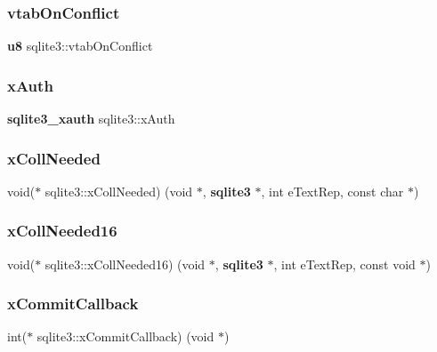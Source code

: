 \mbox{\label{structsqlite3_acb957d1be62bc33b9f28201cd6dc4d5a}} 
\subsubsection{vtabOnConflict}
{\footnotesize\ttfamily \textbf{ u8} sqlite3\+::vtab\+On\+Conflict}

\mbox{\label{structsqlite3_a0be5994042272ecb4fbec9d9a417d38b}} 
\subsubsection{xAuth}
{\footnotesize\ttfamily \textbf{ sqlite3\+\_\+xauth} sqlite3\+::x\+Auth}

\mbox{\label{structsqlite3_a3312d02b28a6743f2f703d363c7c4f9b}} 
\subsubsection{xCollNeeded}
{\footnotesize\ttfamily void($\ast$ sqlite3\+::x\+Coll\+Needed) (void $\ast$, \textbf{ sqlite3} $\ast$, int e\+Text\+Rep, const char $\ast$)}

\mbox{\label{structsqlite3_a531dea6bd5cf5f13a8f17c66bf66ac92}} 
\subsubsection{xCollNeeded16}
{\footnotesize\ttfamily void($\ast$ sqlite3\+::x\+Coll\+Needed16) (void $\ast$, \textbf{ sqlite3} $\ast$, int e\+Text\+Rep, const void $\ast$)}

\mbox{\label{structsqlite3_aafa01826b1329161f4fd7ed9a2579a93}} 
\subsubsection{xCommitCallback}
{\footnotesize\ttfamily int($\ast$ sqlite3\+::x\+Commit\+Callback) (void $\ast$)}

\mbox{\label{structsqlite3_ab0aefde204a9c4dead89396ba929e5ca}} 
